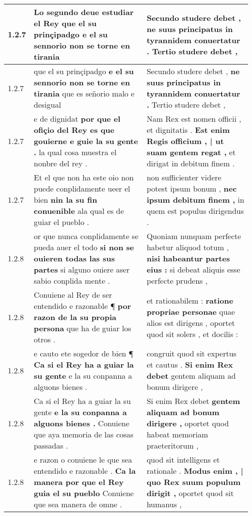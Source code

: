 \begin{tabular}{|p{1cm}|p{6.5cm}|p{6.5cm}|}
1.2.7 & Lo segundo deue estudiar el Rey \textbf{ que el su prinçipadgo } e el su sennorio non se torne en tirania & Secundo studere debet , \textbf{ ne suus principatus in tyrannidem conuertatur . } Tertio studere debet , \\\hline
1.2.7 & que el su prinçipadgo \textbf{ e el su sennorio non se torne en tirania } que es señorio malo e desigual & Secundo studere debet , \textbf{ ne suus principatus in tyrannidem conuertatur . } Tertio studere debet , \\\hline
1.2.7 & e de dignidat \textbf{ por que el ofiçio del Rey es que gouierne e guie la su gente . } la qual cosa muestra el nonbre del rey . & Nam Rex est nomen officii , et dignitatis . \textbf{ Est enim Regis officium , | ut suam gentem regat , } et dirigat in debitum finem . \\\hline
1.2.7 & Et el que non ha este oio non puede conplidamente ueer el bien \textbf{ nin la su fin conuenible } ala qual es de guiar el pueblo . & non sufficienter videre potest ipsum bonum , \textbf{ nec ipsum debitum finem , } in quem est populus dirigendus . \\\hline
1.2.8 & or que nunca conplidamente se pueda auer el todo \textbf{ si non se ouieren todas las sus partes } si alguno ouiere aser sabio conplida mente . & Quoniam nunquam perfecte habetur aliquod totum , \textbf{ nisi habeantur partes eius : } si debeat aliquis esse perfecte prudens , \\\hline
1.2.8 & Conuiene al Rey de ser entendido e razonable ¶ \textbf{ por razon de la su propia persona } que ha de guiar los otros . & et rationabilem : \textbf{ ratione propriae personae } quae alios est dirigens , oportet quod sit solers , et docilis : \\\hline
1.2.8 & e cauto ete sogedor de bien ¶ \textbf{ Ca si el Rey ha a guiar la su gente } e la su conpanna a alguons bienes . & congruit quod sit expertus et cautus . \textbf{ Si enim Rex debet } gentem aliquam ad bonum dirigere , \\\hline
1.2.8 & Ca si el Rey ha a guiar la su gente \textbf{ e la su conpanna a alguons bienes . } Conuiene que aya memoria de las cosas passadas . & Si enim Rex debet \textbf{ gentem aliquam ad bonum dirigere , } oportet quod habeat memoriam praeteritorum , \\\hline
1.2.8 & e razon o conuiene le que sea entendido e razonable . \textbf{ Ca la manera por que el Rey guia el su pueblo } Conuiene que sea manera de omne . & quod sit intelligens et rationale . \textbf{ Modus enim , | quo Rex suum populum dirigit , } oportet quod sit humanus , \\\hline

\end{tabular}
